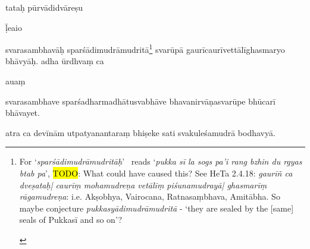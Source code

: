 \documentclass[naipra.tex]{subfiles}
\begin{document}
\begin{sanskrit}

\pstart
tataḥ pūrvādidvāreṣu \begin{mantra}ḹ\dsh e\dsh ai\dsh o\end{mantra}\dsh svarasambhavāḥ sparśādimudrāmudritā\footnote{\begin{english}
	For `\emph{sparśādimudrāmudritāḥ}' \TIB\ reads `\emph{pukka sī la sogs pa'i rang bzhin du rgyas btab pa}', 
	\hl{TODO}: What could have caused this? See HeTa 2.4.18: \emph{gaurīñ ca dveṣataḥ| caurīṃ mohamudreṇa vetālīṃ piśunamudrayā| ghasmarīṃ rāgamudreṇa}: i.e. Akṣobhya, Vairocana, Ratnasaṃbhava, Amitābha.
	So maybe conjecture \emph{pukkasyādimudrāmudritā} - `they are sealed by the [same] seals of Pukkasī and so on'?
\end{english}} svarūpā gaurīcaurīvettālīghasmaryo bhāvyāḥ. 
 adha ūrdhvaṃ ca  \begin{mantra}au\dsh aṃ\end{mantra}\dsh svarasambhave sparśadharmadhātusvabhāve bhavanirvāṇasvarūpe bhūcarī bhāvayet.
\pend


\pstart
atra ca devīnām utpatyanantaraṃ bhiṣeke sati svakuleśamudrā bodhavyā. 
\pend


\end{sanskrit}
\end{document}
